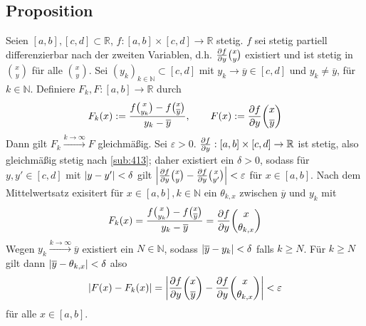 \subsection[Proposition: Differentialquotient und partielle Ableitung]{Proposition} %
\label{sub:93}
Seien $[a,b], [c,d] \subset \mathds{R}$, $f : [a,b] \times [c,d] \to \mathds{R}$ stetig. $f$ sei stetig partiell differenzierbar nach der zweiten Variablen, d.h.
$\diff{f}{y} \binom{x}{y} $ existiert und ist stetig in $\binom{x}{y}$ für alle $\binom{x}{y} $. Sei $(y_k)_{k \in \mathds{N}} \subset [c,d]$ mit $y_k \to \overline{y} \in [c,d]$ und 
$y_k  \not= \overline{y}$, für $k \in \mathds{N} $. Definiere $F_k, F : [a,b] \to \mathds{R}$ durch 
\[
	F_k(x) := \frac{f \binom{x}{y_k} - f \binom{x}{\overline{y} }  }{y_k -\overline{y} }, \qquad F(x) := \diff{f}{y} \binom{x}{\overline{y} }   
\]
Dann gilt $F_k \xrightarrow{k \to \infty}  F$ gleichmäßig.
Sei $\varepsilon >0$. $\diff{f}{y} : [a,b] \times [c,d] \to \mathds{R}$ ist stetig, also gleichmäßig stetig nach \ref{sub:413}; daher existiert ein $\delta  >0$, sodass
für $y,y' \in [c,d]$ mit $\abs*{y-y'}< \delta$ gilt $\abs*{\diff{f}{y} \binom{x}{y} - \diff{f}{y} \binom{x}{y'}} < \varepsilon $ für $x \in [a,b]$. Nach dem Mittelwertsatz
exisitert für $x \in [a,b], k \in \mathds{N}$ ein $\theta_{k,x}$ zwischen $\overline{y}$ und $y_k$ mit 
\begin{align*}
	F_k(x) = \frac{f \binom{x}{y_k} - f \binom{x}{\overline{y} }  }{y_k - \overline{y} } = \diff{f}{y} \binom{x}{\theta_{k,x}} 
\end{align*}
Wegen $y_k \xrightarrow{k \to \infty} \overline{y} $ existiert ein $N \in \mathds{N}$, sodass $\abs*{\overline{y} - y_k } < \delta  $ falls $k \ge N$. Für $k \ge N$ gilt
dann $\abs*{\overline{y} - \theta_{k,x} } < \delta  $ also 
\begin{align*}
	\abs*{ F(x) - F_k (x)} = \abs*{ \diff{f}{y}  \binom{x}{\overline{y} } - \diff{f}{y} \binom{x}{\theta_{k,x}}  }  < \varepsilon
\end{align*}
für alle $x \in [a,b]$. \bewende

